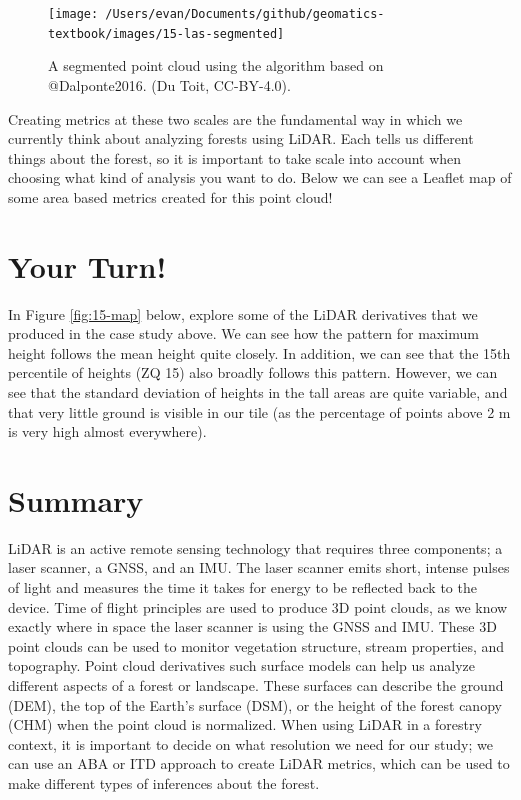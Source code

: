\documentclass[
]{book}
\begin{document}
\begin{figure}
\texttt{[image: /Users/evan/Documents/github/geomatics-textbook/images/15-las-segmented]} \caption{A segmented point cloud using the algorithm based on @Dalponte2016. (Du Toit, CC-BY-4.0).}\label{fig:15-las-segmented}
\end{figure}

Creating metrics at these two scales are the fundamental way in which we currently think about analyzing forests using LiDAR. Each tells us different things about the forest, so it is important to take scale into account when choosing what kind of analysis you want to do. Below we can see a Leaflet map of some area based metrics created for this point cloud!

\hypertarget{your-turn-10}{%
\section*{Your Turn!}\label{your-turn-10}}

In Figure \ref{fig:15-map} below, explore some of the LiDAR derivatives that we produced in the case study above. We can see how the pattern for maximum height follows the mean height quite closely. In addition, we can see that the 15th percentile of heights (ZQ 15) also broadly follows this pattern. However, we can see that the standard deviation of heights in the tall areas are quite variable, and that very little ground is visible in our tile (as the percentage of points above 2 m is very high almost everywhere).

\hypertarget{summary-11}{%
\section{Summary}\label{summary-11}}

LiDAR is an active remote sensing technology that requires three components; a laser scanner, a GNSS, and an IMU. The laser scanner emits short, intense pulses of light and measures the time it takes for energy to be reflected back to the device. Time of flight principles are used to produce 3D point clouds, as we know exactly where in space the laser scanner is using the GNSS and IMU. These 3D point clouds can be used to monitor vegetation structure, stream properties, and topography. Point cloud derivatives such surface models can help us analyze different aspects of a forest or landscape. These surfaces can describe the ground (DEM), the top of the Earth's surface (DSM), or the height of the forest canopy (CHM) when the point cloud is normalized. When using LiDAR in a forestry context, it is important to decide on what resolution we need for our study; we can use an ABA or ITD approach to create LiDAR metrics, which can be used to make different types of inferences about the forest.
\end{document}
